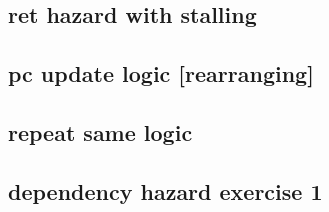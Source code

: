 \subsection{ret hazard with stalling}


\subsection{pc update logic [rearranging]}


\subsection{repeat same logic}


\subsection{dependency hazard exercise 1}



